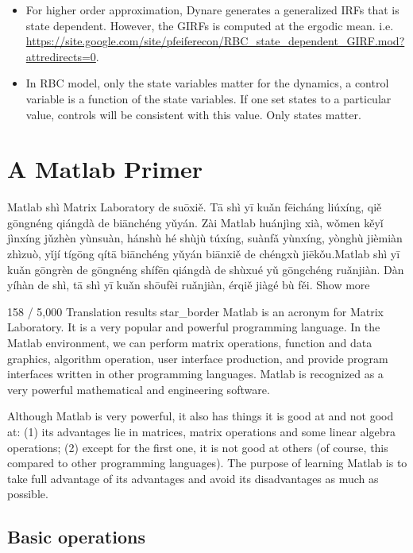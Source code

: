 \documentclass[10pt,math=newtx,citestyle=gb7714-2015,bibstyle=gb7714-2015]{elegantbook}
\begin{document}
{{{\begin{enumerate}
{\begin{itemize}
				\item For higher order approximation, Dynare generates a generalized IRFs that is state dependent. However, the GIRFs is computed at the ergodic mean. i.e. \url{https://site.google.com/site/pfeiferecon/RBC\_state\_dependent\_GIRF.mod?attredirects=0}.
				\item In RBC model, only the state variables matter for the dynamics, a control variable is a function of the state variables. If one set states to a particular value, controls will be consistent with this value. Only states matter.
			\end{itemize}
		}
	\end{enumerate}
	

	
	\chapter{A Matlab Primer}
	
	
Matlab shì Matrix Laboratory de suōxiě. Tā shì yī kuǎn fēicháng liúxíng, qiě gōngnéng qiángdà de biānchéng yǔyán. Zài Matlab huánjìng xià, wǒmen kěyǐ jìnxíng jǔzhèn yùnsuàn, hánshù hé shùjù túxíng, suànfǎ yùnxíng, yònghù jièmiàn zhìzuò, yǐjí tígōng qítā biānchéng yǔyán biānxiě de chéngxù jiēkǒu.Matlab shì yī kuǎn gōngrèn de gōngnéng shífēn qiángdà de shùxué yǔ gōngchéng ruǎnjiàn. Dàn yíhàn de shì, tā shì yī kuǎn shōufèi ruǎnjiàn, érqiě jiàgé bù fěi.
Show more


158 / 5,000
Translation results
star_border
    Matlab is an acronym for Matrix Laboratory. It is a very popular and powerful programming language. In the Matlab environment, we can perform matrix operations, function and data graphics, algorithm operation, user interface production, and provide program interfaces written in other programming languages. Matlab is recognized as a very powerful mathematical and engineering software.
	
	Although Matlab is very powerful, it also has things it is good at and not good at: (1) its advantages lie in matrices, matrix operations and some linear algebra operations; (2) except for the first one, it is not good at others (of course, this compared to other programming languages). The purpose of learning Matlab is to take full advantage of its advantages and avoid its disadvantages as much as possible.
	
	\section{Basic operations}
	
}}}
\end{document}
